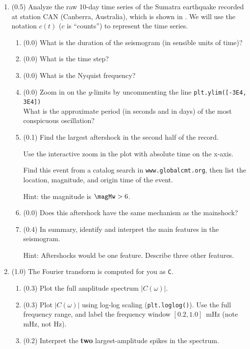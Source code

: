 \documentclass[11pt,titlepage,fleqn]{article}
\newcommand{\tfileresponse}{{\tt hw\_sumatraA\_CAN\_response.ipynb}}
\begin{document}
\begin{enumerate}



\item (0.5) Analyze the raw 10-day time series of the Sumatra earthquake recorded at station CAN (Canberra, Australia), which is shown in . We will use the notation $c(t)$ ($c$ is ``counts'') to represent the time series.

\begin{enumerate}
\item (0.0) What is the duration of the seismogram (in sensible units of time)?
\item (0.0) What is the time step?
\item (0.0) What is the Nyquist frequency?
\item (0.0) Zoom in on the $y$-limits by uncommenting the line \verb+plt.ylim([-3E4, 3E4])+ \\
What is the approximate period (in seconds and in days) of the most conspicuous oscillation?

\item (0.1) Find the largest aftershock in the second half of the record.

Use the interactive zoom in the plot with absolute time on the x-axis.

Find this event from a catalog search in \verb+www.globalcmt.org+, then list the location, magnitude, and origin time of the event.

Hint: the magnitude is $\magMw > 6$.

\item (0.0) Does this aftershock have the same mechanism as the mainshock?
\item (0.4) In summary, identify and interpret the main features in the seismogram.

Hint: Aftershocks would be one feature. Describe three other features.
\end{enumerate}


\item (1.0) The Fourier transform is computed for you as \verb+C+.
\begin{enumerate}
\item (0.3) Plot the full amplitude spectrum $|C(\omega)|$.
\item (0.3) Plot $|C(\omega)|$ using log-log scaling (\verb+plt.loglog()+). Use the full frequency range, and label the frequency window $[0.2,1.0]$~mHz (note mHz, not Hz).
\item (0.2) Interpret the {\bf two} largest-amplitude spikes in the spectrum.


\end{enumerate}
\end{enumerate}
\end{document}
